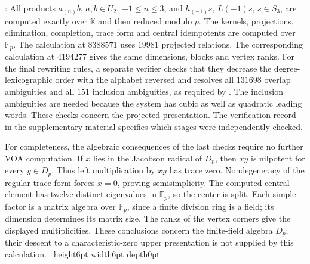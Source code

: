 \documentclass[leqno]{article}
\newcommand{\K}{\ensuremath{\mathbb{K}}}
\renewcommand{\leq}{\ensuremath{\leqslant}}
\newcommand{\qed}{\hfill \vrule height6pt  width6pt depth0pt}
\newenvironment{proof}[1][]{\noindent {\it Proof #1} : }{\hbox{~}\qed
\smallskip
}
\numberwithin{equation}{section}
\begin{document}
\begin{proof}
All products $a_{(n)}b$, $a,b \in U_2$, $-1 \leq n \leq 3$, and $h_{(-1)}s$, $L(-1)s$, $s \in S_3$, are computed exactly over $\K$ and then reduced modulo $p$. The kernels, projections, elimination, completion, trace form and central idempotents are computed over $\mathbb F_p$. The calculation at $8388571$ uses $19981$ projected relations. The corresponding calculation at $4194277$ gives the same dimensions, blocks and vertex ranks. For the final rewriting rules, a separate verifier checks that they decrease the degree-lexicographic order with the alphabet reversed and resolves all $131698$ overlap ambiguities and all $151$ inclusion ambiguities, as required by \cite[Theorem 1.2]{Ber78}. The inclusion ambiguities are needed because the system has cubic as well as quadratic leading words. These checks concern the projected presentation. The verification record in the supplementary material specifies which stages were independently checked.

For completeness, the algebraic consequences of the last checks require no further VOA computation. If $x$ lies in the Jacobson radical of $D_p$, then $xy$ is nilpotent for every $y \in D_p$. Thus left multiplication by $xy$ has trace zero. Nondegeneracy of the regular trace form forces $x = 0$, proving semisimplicity. The computed central element has twelve distinct eigenvalues in $\mathbb F_p$, so the center is split. Each simple factor is a matrix algebra over $\mathbb F_p$, since a finite division ring is a field; its dimension determines its matrix size. The ranks of the vertex corners give the displayed multiplicities. These conclusions concern the finite-field algebra $D_p$; their descent to a characteristic-zero upper presentation is not supplied by this calculation.
\end{proof}
\end{document}
